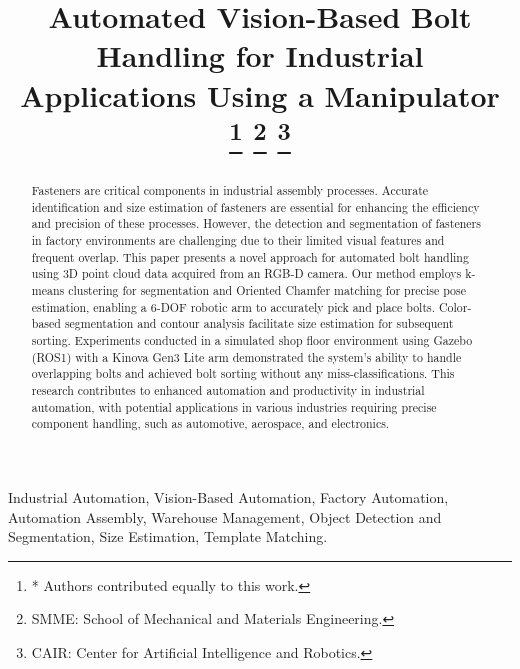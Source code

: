 \documentclass[conference]{IEEEtran}
\begin{document}
\title{Automated Vision-Based Bolt Handling for Industrial Applications Using a Manipulator\\
\thanks{* Authors contributed equally to this work.}
\thanks{SMME: School of Mechanical and Materials Engineering.}
\thanks{CAIR: Center for Artificial Intelligence and Robotics.}}

\author{
\and
{}
\and
{}
}

\maketitle

\begin{abstract}
Fasteners are critical components in industrial assembly processes. Accurate identification and size estimation of fasteners are essential for enhancing the efficiency and precision of these processes. However, the detection and segmentation of fasteners in factory environments are challenging due to their limited visual features and frequent overlap. This paper presents a novel approach for automated bolt handling using 3D point cloud data acquired from an RGB-D camera. Our method employs k-means clustering for segmentation and Oriented Chamfer matching for precise pose estimation, enabling a 6-DOF robotic arm to accurately pick and place bolts. Color-based segmentation and contour analysis facilitate size estimation for subsequent sorting. Experiments conducted in a simulated shop floor environment using Gazebo (ROS1) with a Kinova Gen3 Lite arm demonstrated the system's ability to handle overlapping bolts and achieved bolt sorting without any miss-classifications. This research contributes to enhanced automation and productivity in industrial automation, with potential applications in various industries requiring precise component handling, such as automotive, aerospace, and electronics.
\end{abstract}
\begin{IEEEkeywords}
Industrial Automation, Vision-Based Automation, Factory Automation, Automation Assembly, Warehouse Management, Object Detection and Segmentation, Size Estimation, Template Matching.
\end{IEEEkeywords}
\end{document}
